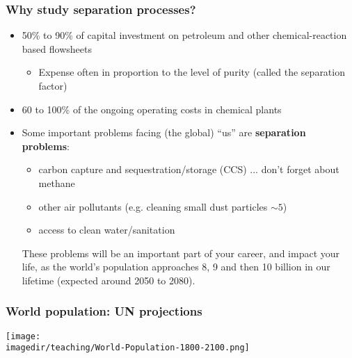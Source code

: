 \begin{frame}\frametitle{Why study separation processes?}
	\begin{itemize}
		\item	50\% to 90\% of capital investment on petroleum and other chemical-reaction based flowsheets 
		\begin{itemize}
			\item	Expense often in proportion to the level of purity (called the {\color{purple}separation factor}) 
		\end{itemize}
		\item	60 to 100\% of the ongoing operating costs in chemical plants  %
		\item	Some important problems facing (the global) ``us'' are \textbf{separation problems}:
		\begin{itemize}
			\item	carbon capture and sequestration/storage (CCS) ... don't forget about methane
			\item	other air pollutants (e.g. cleaning small dust particles $\sim 5$\micron)
			\item	access to clean water/sanitation
		\end{itemize}

		\begin{exampleblock}{}
			These problems will be an important part of your career, and impact your life, as the world's population approaches 8, 9 and then 10 billion in our lifetime (expected around 2050 to 2080).
		\end{exampleblock}

	\end{itemize}
\end{frame}

\begin{frame}\frametitle{World population: UN projections}
	\centerline{\texttt{[image: \\imagedir/teaching/World-Population-1800-2100.png]}}
	
	\vspace{-.2cm}
\end{frame}

